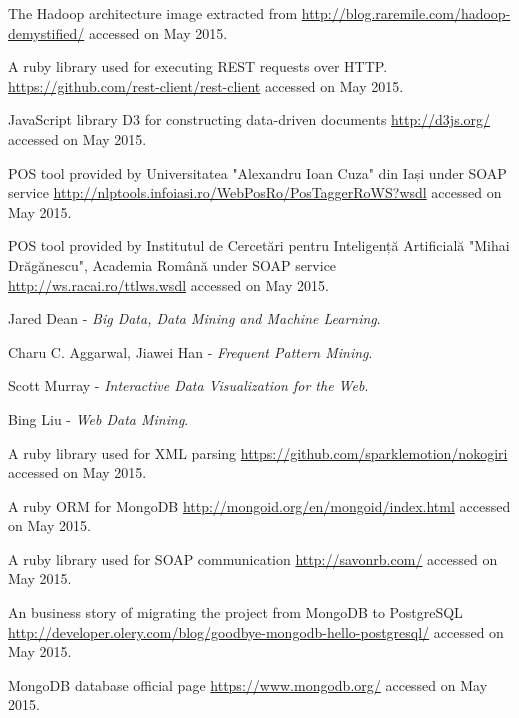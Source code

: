 \begin{thebibliography}{99999}
\singlespace\normalsize


 The Hadoop architecture image extracted from \url{http://blog.raremile.com/hadoop-demystified/} accessed on May 2015.

 A ruby library used for executing REST requests over HTTP. \url{https://github.com/rest-client/rest-client} accessed on May 2015.

 JavaScript library D3 for constructing data-driven documents \url{http://d3js.org/} accessed on May 2015.

 POS tool provided by Universitatea "Alexandru Ioan Cuza" din Iași under SOAP service \url{http://nlptools.infoiasi.ro/WebPosRo/PosTaggerRoWS?wsdl} accessed on May 2015.

 POS tool provided by Institutul de Cercetări pentru Inteligență Artificială "Mihai Drăgănescu", Academia Română under SOAP service \url{http://ws.racai.ro/ttlws.wsdl} accessed on May 2015.

 Jared Dean - \emph{Big Data, Data Mining and Machine Learning}.

 Charu C. Aggarwal, Jiawei Han - \emph{Frequent Pattern Mining}.

 Scott Murray - \emph{Interactive Data Visualization for the Web}.

 Bing Liu - \emph{Web Data Mining}.

 A ruby library used for XML parsing \url{https://github.com/sparklemotion/nokogiri} accessed on May 2015.

 A ruby ORM for MongoDB \url{http://mongoid.org/en/mongoid/index.html} accessed on May 2015.

 A ruby library used for SOAP communication \url{http://savonrb.com/} accessed on May 2015.

 An business story of migrating the project from MongoDB to PostgreSQL \url{http://developer.olery.com/blog/goodbye-mongodb-hello-postgresql/} accessed on May 2015.

 MongoDB database official page \url{https://www.mongodb.org/} accessed on May 2015.


\end{thebibliography}
